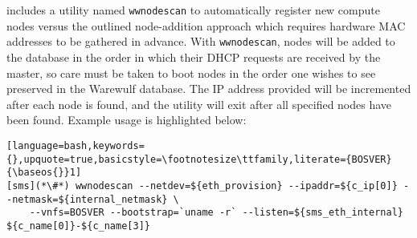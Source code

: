 \begin{center}
\begin{tcolorbox}[]
\small \Warewulf{} includes a utility named \texttt{wwnodescan} 
to automatically register new compute nodes versus the outlined node-addition approach
which requires hardware MAC addresses to be gathered in advance.  With
\texttt{wwnodescan}, nodes will be added to the \Warewulf{} database in the
order in which their DHCP requests are received by the master, so care must be
taken to boot nodes in the order one wishes to see preserved in the Warewulf
database. The IP address provided will be incremented after each node is found,
and the utility will exit after all specified nodes have been found. Example
usage is highlighted below:
\begin{lstlisting}[language=bash,keywords={},upquote=true,basicstyle=\footnotesize\ttfamily,literate={BOSVER}{\baseos{}}1]
[sms](*\#*) wwnodescan --netdev=${eth_provision} --ipaddr=${c_ip[0]} --netmask=${internal_netmask} \
    --vnfs=BOSVER --bootstrap=`uname -r` --listen=${sms_eth_internal} ${c_name[0]}-${c_name[3]}
\end{lstlisting}
\end{tcolorbox}
\end{center}
